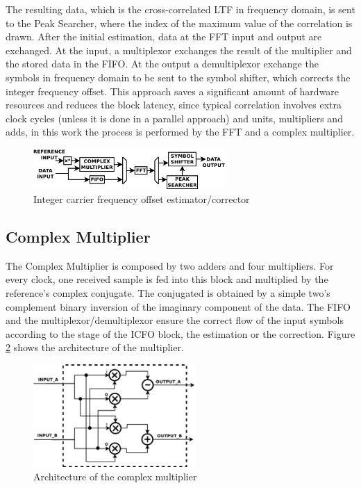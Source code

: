 The resulting data, which is the cross-correlated LTF in frequency domain, is sent to 
the Peak Searcher, where the index of the maximum value of the correlation is drawn. After the initial 
estimation, data at the FFT input and output are exchanged. At the 
input, a multiplexor exchanges the result of the multiplier and the stored data in
the FIFO. At the output a demultiplexor exchange the symbols in frequency domain 
to be sent to the symbol shifter, which corrects the integer frequency offset.
This approach saves a significant amount of hardware resources and reduces the block latency, since 
typical correlation involves extra clock cycles (unless it is done in a parallel approach) and units, multipliers and adds, in this work the process is performed by the FFT and a complex multiplier.

\begin{figure}[!hbt]
  \centering
    \includegraphics[width=0.65\textwidth]
      {./figures/int_cfo_arch}
  \caption{Integer carrier frequency offset estimator/corrector}
  \label{fig:arq_cfo}
\end{figure}

\subsection{Complex Multiplier}
The Complex Multiplier is composed by two adders and four 
multipliers. For every clock, one received sample is fed into this block and 
multiplied by the reference's complex conjugate. The conjugated is obtained by  
 a simple  two's complement binary inversion of the imaginary component of the data. The FIFO
and the multiplexor/demultiplexor ensure the correct flow of the input symbols
according to the stage of the ICFO block, the estimation or the correction. Figure \ref{fig:cmplx_mult} shows the architecture of the multiplier. 



\begin{figure}[!hbt]
  \centering
    \includegraphics[width=0.55\textwidth]
      {./figures/complex_multiplier_architecture}
  \caption{Architecture of the complex multiplier}
  \label{fig:cmplx_mult}
\end{figure}





